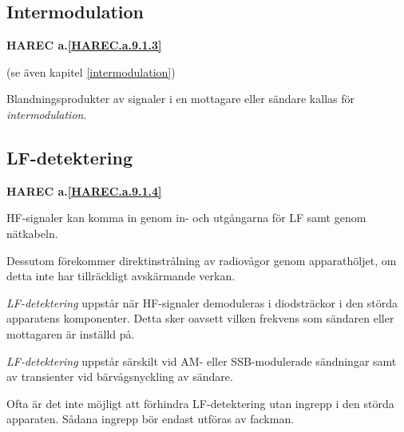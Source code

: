 \subsection{Intermodulation}
\textbf{
HAREC a.\ref{HAREC.a.9.1.3}\label{myHAREC.a.9.1.3}
}

(se även kapitel \ref{intermodulation})

Blandningsprodukter av signaler i en mottagare eller sändare kallas
för \emph{intermodulation}.

\subsection{LF-detektering}
\textbf{
HAREC a.\ref{HAREC.a.9.1.4}\label{myHAREC.a.9.1.4}
}

HF-signaler kan komma in genom in- och utgångarna för LF samt genom nätkabeln.

Dessutom förekommer direktinstrålning av radiovågor genom apparathöljet, om
detta inte har tillräckligt avskärmande verkan.

\emph{LF-detektering} uppstår när HF-signaler demoduleras i diodsträckor i den
störda apparatens komponenter.
Detta sker oavsett vilken frekvens som sändaren eller mottagaren är inställd på.

\emph{LF-detektering} uppstår särskilt vid AM- eller SSB-modulerade sändningar
samt av transienter vid bärvågsnyckling av sändare.

Ofta är det inte möjligt att förhindra LF-detektering utan ingrepp i den störda
apparaten.
Sådana ingrepp bör endast utföras av fackman.
